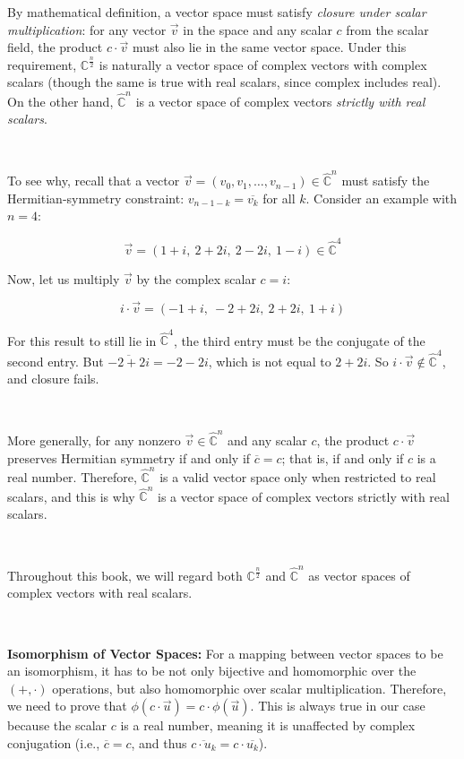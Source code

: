 \begin{tcolorbox}[title={\textbf{Vector Space of Complex Vectors with either Real or Complex Scalars}}]

By mathematical definition, a vector space must satisfy \textit{closure under scalar multiplication}: for any vector $\vec{v}$ in the space and any scalar $c$ from the scalar field, the product $c \cdot \vec{v}$ must also lie in the same vector space.  Under this requirement, $\mathbb{C}^{\frac{n}{2}}$ is naturally a vector space of complex vectors with complex scalars (though the same is true with real scalars, since complex includes real). On the other hand, $\hat{\mathbb{C}}^{n}$ is a vector space of complex vectors \textit{strictly with real scalars}.

$ $

To see why, recall that a vector $\vec{v} = (v_0, v_1, \dots, v_{n-1}) \in \hat{\mathbb{C}}^n$ must satisfy the Hermitian-symmetry constraint: $v_{n-1-k} = \overline{v_k}$ for all $k$. Consider an example with $n = 4$:

$$\vec{v} = (1+i,\ 2+2i,\ 2-2i,\ 1-i) \in \hat{\mathbb{C}}^4$$

Now, let us multiply $\vec{v}$ by the complex scalar $c = i$:

$$i \cdot \vec{v} = (-1+i,\ -2+2i,\ 2+2i,\ 1+i)$$

For this result to still lie in $\hat{\mathbb{C}}^4$, the third entry must be the conjugate of the second entry. But $\overline{-2+2i} = -2-2i$, which is not equal to $2+2i$. So $i \cdot \vec{v} \notin \hat{\mathbb{C}}^4$, and closure fails.

$ $

More generally, for any nonzero $\vec{v} \in \hat{\mathbb{C}}^n$ and any scalar $c$, the product $c \cdot \vec{v}$ preserves Hermitian symmetry if and only if $\overline{c} = c$; that is, if and only if $c$ is a real number. Therefore, $\hat{\mathbb{C}}^n$ is a valid vector space only when restricted to real scalars, and this is why $\hat{\mathbb{C}}^n$ is a vector space of complex vectors strictly with real scalars.

$ $

Throughout this book, we will regard both $\mathbb{C}^{\frac{n}{2}}$ and $\hat{\mathbb{C}}^{n}$ as vector spaces of complex vectors with real scalars.

$ $

\textbf{Isomorphism of Vector Spaces:} For a mapping between vector spaces to be an isomorphism, it has to be not only bijective and homomorphic over the $(+, \cdot)$ operations, but also homomorphic over scalar multiplication. Therefore, we need to prove that $\phi(c \cdot \vec{u}) = c \cdot \phi(\vec{u})$. This is always true in our case because the scalar $c$ is a real number, meaning it is unaffected by complex conjugation (i.e., $\overline{c} = c$, and thus $\overline{c \cdot u_k} = c \cdot \overline{u_k}$). 


\end{tcolorbox}
